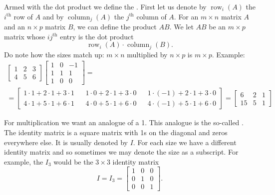 Armed with the dot product we define the
\emph{}.
First let us denote by $\operatorname{row}_i(A)$ the $i^{\text{th}}$ row
of $A$ and by
$\operatorname{column}_j(A)$ the $j^{\text{th}}$ column of $A$.
For an $m \times n$ matrix $A$ and an $n \times p$ matrix $B$,
we can define the product $AB$.  We let $AB$ be an $m \times p$
matrix whose $ij^{\text{th}}$ entry is the dot product
\begin{equation*}
\operatorname{row}_i(A) \cdot
\operatorname{column}_j(B) .
\end{equation*}
Do note how the sizes match up: $m \times n$ multiplied by $n \times p$ is 
$m \times p$.  Example:
\begin{multline*}
\begin{bmatrix}
1 & 2 & 3 \\
4 & 5 & 6
\end{bmatrix}
\begin{bmatrix}
1 & 0 & -1 \\
1 & 1 & 1 \\
1 & 0 & 0
\end{bmatrix}
= \\ =
\begin{bmatrix}
1\cdot 1 + 2\cdot 1 + 3 \cdot 1 &  &
1\cdot 0 + 2\cdot 1 + 3 \cdot 0 &  &
1\cdot (-1) + 2\cdot 1 + 3 \cdot 0 \\
4\cdot 1 + 5\cdot 1 + 6 \cdot 1 &  &
4\cdot 0 + 5\cdot 1 + 6 \cdot 0 &  &
4\cdot (-1) + 5\cdot 1 + 6 \cdot 0
\end{bmatrix}
=
\begin{bmatrix}
6 & 2 & 1 \\
15 & 5 & 1
\end{bmatrix}
\end{multline*}

\medskip

For multiplication we want an analogue of a 1.  This analogue is the
so-called \emph{}.
The identity matrix is a square matrix with 1s on the
diagonal and zeros everywhere else.  It is usually denoted by $I$.
For each size we have a different identity matrix and so sometimes we may denote
the size as a subscript.  For example, the $I_3$ would be the $3 \times 3$
identity matrix
\begin{equation*}
I = I_3 =
\begin{bmatrix}
1 & 0 & 0 \\
0 & 1 & 0 \\
0 & 0 & 1
\end{bmatrix} .
\end{equation*}

